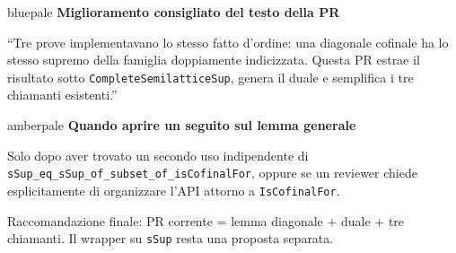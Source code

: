 \documentclass[10pt]{article}
\begin{document}
\vspace{8pt}
\begin{softbox}{bluepale}
{\sffamily\bfseries Miglioramento consigliato del testo della PR}\par
\small
``Tre prove implementavano lo stesso fatto d'ordine: una diagonale cofinale ha lo stesso supremo
della famiglia doppiamente indicizzata. Questa PR estrae il risultato sotto
\texttt{CompleteSemilatticeSup}, genera il duale e semplifica i tre chiamanti esistenti.''
\end{softbox}

\vspace{8pt}
\begin{softbox}{amberpale}
{\sffamily\bfseries Quando aprire un seguito sul lemma generale}\par
Solo dopo aver trovato un secondo uso indipendente di
\texttt{sSup\_eq\_sSup\_of\_subset\_of\_isCofinalFor}, oppure se un reviewer chiede
esplicitamente di organizzare l'API attorno a \texttt{IsCofinalFor}.
\end{softbox}

\vfill
{\color{muted}\scriptsize\sffamily Raccomandazione finale: PR corrente = lemma diagonale + duale + tre chiamanti. Il wrapper su \texttt{sSup} resta una proposta separata.}
\end{document}
